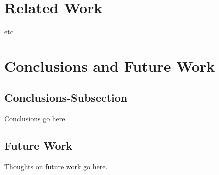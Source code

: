 \documentclass[10pt]{article}
\begin{document}

\section{Related Work}
\label{sec:Related}
etc

\section{Conclusions and Future Work}

\subsection{Conclusions-Subsection}
\label{sec:Conclusions-Subsection}

Conclusions go here. 

\subsection{Future Work}
\label{sec:Future Work}
Thoughts on future work go here.



\end{document}
